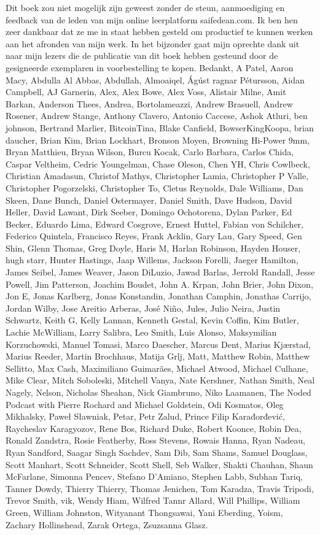 Dit boek zou niet mogelijk zijn geweest zonder de steun, aanmoediging en feedback van de leden van mijn online leerplatform saifedean.com. Ik ben hen zeer dankbaar dat ze me in staat hebben gesteld om productief te kunnen werken aan het afronden van mijn werk. In het bijzonder gaat mijn oprechte dank uit naar mijn lezers die de publicatie van dit boek hebben gesteund door de gesigneerde exemplaren in voorbestelling te kopen. Bedankt, A Patel, Aaron Macy, Abdulla Al Abbas, Abdullah, Almoaiqel, Ágúst ragnar Pétursson, Aidan Campbell, AJ Garnerin, Alex, Alex Bowe, Alex Voss, Alistair Milne, Amit Barkan, Anderson Thees, Andrea, Bortolameazzi, Andrew Brasuell, Andrew Rosener, Andrew Stange, Anthony Clavero, Antonio Caccese, Ashok Atluri, ben johnson, Bertrand Marlier, BitcoinTina, Blake Canfield, BowserKingKoopa, brian daucher, Brian Kim, Brian Lockhart, Bronson Moyen, Browning Hi-Power 9mm, Bryan Matthieu, Bryan Wilson, Burcu Kocak, Carlo Barbara, Carlos Chida, Caspar Veltheim, Cedric Youngelman, Chase Oleson, Chen YH, Chris Cowlbeck, Christian Amadasun, Christof Mathys, Christopher Lamia, Christopher P Valle, Christopher Pogorzelski, Christopher To, Cletus Reynolds, Dale Williams, Dan Skeen, Dane Bunch, Daniel Ostermayer, Daniel Smith, Dave Hudson, David Heller, David Lawant, Dirk Seeber, Domingo Ochotorena, Dylan Parker, Ed Becker, Eduardo Lima, Edward Cosgrove, Ernest Huttel, Fabian von Schilcher, Federico Quintela, Francisco Reyes, Frank Acklin, Gary Lau, Gary Speed, Gen Shin, Glenn Thomas, Greg Doyle, Haris M, Harlan Robinson, Hayden Houser, hugh starr, Hunter Hastings, Jaap Willems, Jackson Forelli, Jaeger Hamilton, James Seibel, James Weaver, Jason DiLuzio, Jawad Barlas, Jerrold Randall, Jesse Powell, Jim Patterson, Joachim Boudet, John A. Krpan, John Brier, John Dixon, Jon E, Jonas Karlberg, Jonas Konstandin, Jonathan Camphin, Jonathas Carrijo, Jordan Wilby, Jose Areitio Arberas, José Niño, Jules, Julio Neira, Justin Schwartz, Keith G, Kelly Lannan, Kenneth Gestal, Kevin Coffin, Kim Butler, Lachie McWilliam, Larry Salibra, Leo Smith, Luis Alonso, Maksymilian Korzuchowski, Manuel Tomasi, Marco Daescher, Marcus Dent, Marius Kjærstad, Marius Reeder, Martin Brochhaus, Matija Grlj, Matt, Matthew Robin, Matthew Sellitto, Max Cash, Maximiliano Guimarães, Michael Atwood, Michael Culhane, Mike Clear, Mitch Soboleski, Mitchell Vanya, Nate Kershner, Nathan Smith, Neal Nagely, Nelson, Nicholas Sheahan, Nick Giambruno, Niko Laamanen, The Noded Podcast with Pierre Rochard and Michael Goldstein, Odi Kosmatos, Oleg Mikhalsky, Paweł Sławniak, Petar, Petr Zalud, Prince Filip Karađorđević, Raycheslav Karagyozov, Rene Bos, Richard Duke, Robert Koonce, Robin Dea, Ronald Zandstra, Rosie Featherby, Ross Stevens, Rowais Hanna, Ryan Nadeau, Ryan Sandford, Saagar Singh Sachdev, Sam Dib, Sam Shams, Samuel Douglass, Scott Manhart, Scott Schneider, Scott Shell, Seb Walker, Shakti Chauhan, Shaun McFarlane, Simonna Pencev, Stefano D’Amiano, Stephen Labb, Subhan Tariq, Tanner Dowdy, Thierry Thierry, Thomas Jenichen, Tom Karadza, Travis Tripodi, Trevor Smith, vik, Wendy Hiam, Wilfred Tannr Allard, Will Phillips, William Green, William Johnston, Wityanant Thongsawai, Yani Eberding, Yoism, Zachary Hollinshead, Zarak Ortega, Zsuzsanna Glasz.
